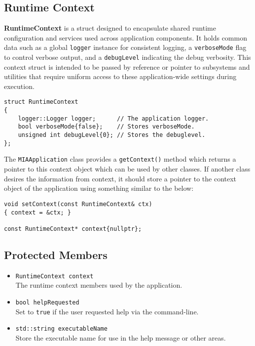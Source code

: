 \subsection*{Runtime Context}
\textbf{RuntimeContext} is a struct designed to encapsulate shared runtime configuration and services used across application components. It holds common data such as a global \texttt{logger} instance for consistent logging, a \texttt{verboseMode} flag to control verbose output, and a \texttt{debugLevel} indicating the debug verbosity. This context struct is intended to be passed by reference or pointer to subsystems and utilities that require uniform access to these application-wide settings during execution.
\begin{lstlisting}[style=cppstyle]
struct RuntimeContext
{
	logger::Logger logger;      // The application logger.
	bool verboseMode{false};    // Stores verboseMode.
	unsigned int debugLevel{0}; // Stores the debuglevel.
};
\end{lstlisting}
The \texttt{MIAApplication} class provides a \texttt{getContext()} method which returns a pointer to this context object which can be used by other classes. If another class desires the information from context, it should store a pointer to the context object of the application using something similar to the below:
\begin{lstlisting}[style=cppstyle]
void setContext(const RuntimeContext& ctx) 
{ context = &ctx; }

const RuntimeContext* context{nullptr};
\end{lstlisting}


\subsection*{Protected Members}
\begin{itemize}\itemsep0em
	\item \texttt{RuntimeContext context} \\
	The runtime context members used by the application.
	\item \texttt{bool helpRequested} \\
	Set to \texttt{true} if the user requested help via the command-line.
	\item \texttt{std::string executableName} \\
	Store the executable name for use in the help message or other areas.
\end{itemize}

